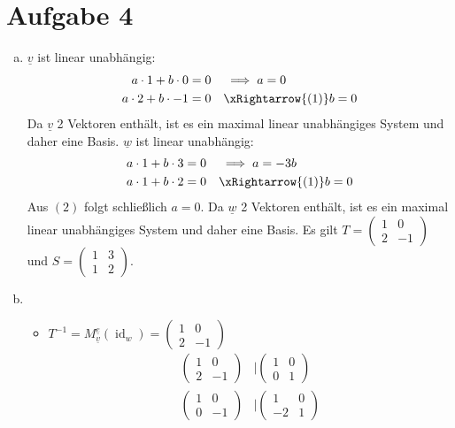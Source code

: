 \documentclass{article}
\newcommand{\id}{\operatorname{id}}
\begin{document}
    \section*{Aufgabe 4}
    \begin{enumerate}[(a)]
        \item $\underline{v}$ ist linear unabhängig:
        \begin{align}
            a \cdot 1 + b \cdot 0  &= 0 &&\implies a = 0\\
            a \cdot 2 + b \cdot -1 &= 0 &&\xRightarrow{(1)} b = 0
        \end{align}
        Da $\underline{v}$ 2 Vektoren enthält, ist es ein maximal linear unabhängiges System und daher eine Basis.
        $\underline{w}$ ist linear unabhängig:
        \begin{align}
            a \cdot 1 + b \cdot 3  &= 0 &&\implies a = -3b\\
            a \cdot 1 + b \cdot 2 &= 0 &&\xRightarrow{(1)} b = 0
        \end{align}
        Aus $(2)$ folgt schließlich $a = 0$. 
        Da $\underline{w}$ 2 Vektoren enthält, ist es ein maximal linear unabhängiges System und daher eine Basis.
        Es gilt $T = \begin{pmatrix} 1 & 0 \\ 2 & -1\end{pmatrix}$ und $S = \begin{pmatrix} 1 & 3 \\ 1 & 2\end{pmatrix}$.
        \item \ \\\begin{itemize}
            \item $T^{-1} = M^{\underline{e}}_{\underline{v}}(\id_w) = \begin{pmatrix} 1 & 0 \\ 2 & -1\end{pmatrix}$
                \begin{align*}
                \begin{pmatrix} 1 & 0 \\ 2 & -1\end{pmatrix}&\Bigg|\begin{pmatrix} 1 & 0 \\ 0 & 1\end{pmatrix}\\
                \begin{pmatrix} 1 & 0 \\ 0 & -1\end{pmatrix}&\Bigg|\begin{pmatrix} 1 & 0 \\ -2 & 1\end{pmatrix}\\

\end{align*}
\end{itemize}
\end{enumerate}
\end{document}

